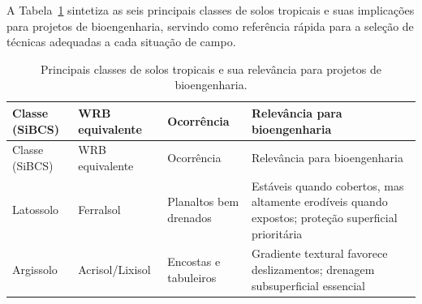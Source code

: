 \documentclass[
  portuguese,
  11pt,
  a4paper,
  open=any]{scrbook}
\begin{document}
A Tabela~\ref{tbl-classes} sintetiza as seis principais classes de solos
tropicais e suas implicações para projetos de bioengenharia, servindo
como referência rápida para a seleção de técnicas adequadas a cada
situação de campo.

\begin{longtable}[]{@{}
  >{\raggedright\arraybackslash}p{}
  >{\raggedright\arraybackslash}p{}
  >{\raggedright\arraybackslash}p{}
  >{\raggedright\arraybackslash}p{}@{}}
\caption{Principais classes de solos tropicais e sua relevância para
projetos de bioengenharia.}\label{tbl-classes}\tabularnewline
\toprule\noalign{}
\begin{minipage}[b]{\linewidth}\raggedright
Classe (SiBCS)
\end{minipage} & \begin{minipage}[b]{\linewidth}\raggedright
WRB equivalente
\end{minipage} & \begin{minipage}[b]{\linewidth}\raggedright
Ocorrência
\end{minipage} & \begin{minipage}[b]{\linewidth}\raggedright
Relevância para bioengenharia
\end{minipage} \\
\midrule\noalign{}
\endfirsthead
\toprule\noalign{}
\begin{minipage}[b]{\linewidth}\raggedright
Classe (SiBCS)
\end{minipage} & \begin{minipage}[b]{\linewidth}\raggedright
WRB equivalente
\end{minipage} & \begin{minipage}[b]{\linewidth}\raggedright
Ocorrência
\end{minipage} & \begin{minipage}[b]{\linewidth}\raggedright
Relevância para bioengenharia
\end{minipage} \\
\midrule\noalign{}
\endhead
\bottomrule\noalign{}
\endlastfoot
Latossolo & Ferralsol & Planaltos bem drenados & Estáveis quando
cobertos, mas altamente erodíveis quando expostos; proteção superficial
prioritária \\
Argissolo & Acrisol/Lixisol & Encostas e tabuleiros & Gradiente textural
favorece deslizamentos; drenagem subsuperficial essencial \\

\end{longtable}
\end{document}
